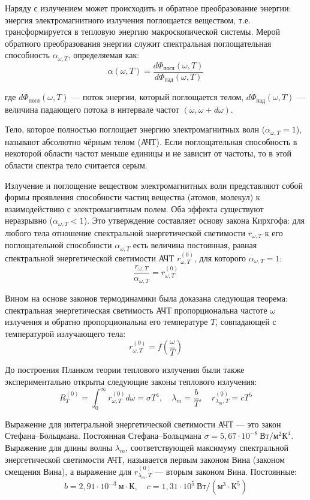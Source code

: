Наряду с излучением может происходить и обратное преобразование энергии: энергия электромагнитного излучения поглощается веществом, т.е. трансформируется в тепловую энергию макроскопической системы. Мерой обратного преобразования энергии служит спектральная поглощательная способность \( \alpha_{\omega,T} \), определяемая как:
\[
\alpha(\omega, T) = \frac{d\Phi_{\text{погл}}(\omega, T)}{d\Phi_{\text{пад}}(\omega, T)} \tag{11.3}
\]

где \( d\Phi_{\text{погл}}(\omega, T) \) — поток энергии, который поглощается телом, \( d\Phi_{\text{пад}}(\omega, T) \) — величина падающего потока в интервале частот \( (\omega, \omega + d\omega) \).

Тело, которое полностью поглощает энергию электромагнитных волн (\( \alpha_{\omega,T} = 1 \)), называют абсолютно чёрным телом (АЧТ). Если поглощательная способность в некоторой области частот меньше единицы и не зависит от частоты, то в этой области спектра тело считается серым.

Излучение и поглощение веществом электромагнитных волн представляют собой формы проявления способности частиц вещества (атомов, молекул) к взаимодействию с электромагнитным полем. Оба эффекта существуют неразрывно (\( \alpha_{\omega,T} < 1 \)). Это утверждение составляет основу закона Кирхгофа: для любого тела отношение спектральной энергетической светимости \( r_{\omega,T} \) к его поглощательной способности \( \alpha_{\omega,T} \) есть величина постоянная, равная спектральной энергетической светимости АЧТ \( r^{(0)}_{\omega,T} \), для которого \( \alpha_{\omega,T} = 1 \):
\[
\frac{r_{\omega,T}}{\alpha_{\omega,T}} = r^{(0)}_{\omega,T} \tag{11.4}
\]

Вином на основе законов термодинамики была доказана следующая теорема: спектральная энергетическая светимость АЧТ пропорциональна частоте \( \omega \) излучения и обратно пропорциональна его температуре \( T \), совпадающей с температурой излучающего тела:
\[
r^{(0)}_{\omega,T} = f\left(\frac{\omega}{T}\right)
\]

До построения Планком теории теплового излучения были также экспериментально открыты следующие законы теплового излучения:
\[
R^{(0)}_T = \int_0^\infty r^{(0)}_{\omega,T} d\omega = \sigma T^4, \quad \lambda_m = \frac{b}{T}, \quad r^{(0)}_{\lambda_m,T} = cT^5 \tag{11.5}
\]

Выражение для интегральной энергетической светимости АЧТ — это закон Стефана–Больцмана. Постоянная Стефана–Больцмана \( \sigma = 5{,}67 \cdot 10^{-8}~\text{Вт}/\text{м}^2\text{К}^4 \). Выражение для длины волны \( \lambda_m \), соответствующей максимуму спектральной энергетической светимости АЧТ, называется первым законом Вина (законом смещения Вина), а выражение для \( r^{(0)}_{\lambda_m,T} \) — вторым законом Вина. Постоянные:
\[
b = 2{,}91 \cdot 10^{-3}~\text{м}\cdot\text{К}, \quad c = 1{,}31 \cdot 10^5~\text{Вт}/(\text{м}^3\cdot\text{К}^5)
\]

